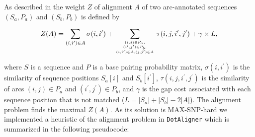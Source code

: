 \documentclass[a4paper,twoside]{article}
\newcommand\dotaligner{\texttt{DotAligner}}
\begin{document}
As described in \cite{Palu2010} the weight $Z$ of alignment \emph{A} of two
arc-annotated sequences $(S_a,P_a)$ and $(S_b,P_b)$ is defined by

\begin{equation}\label{eq1}
	Z(A) = \sum_{(i,i^\prime) \in A} \sigma(i,i^\prime) + \sum_{(i,j) \in
	P_a,\atop {(i^\prime,j^\prime) \in P_b,\atop {(i,i^\prime) \in
	A, (j,j^\prime) \in A}}} \tau(i,j,i^\prime,j^\prime) + \gamma
	\times L,
\end{equation}

where $S$ is a sequence and $P$ is a base pairing probability matrix,
$\sigma(i,i^\prime)$ is the similarity of sequence positions $S_a[i]$ and
$S_b[i^\prime]$, $\tau(i,j,i^\prime,j^\prime)$ is the similarity of arcs $(i,j)
\in P_a$ and $(i^\prime,j^\prime) \in P_b$,
and $\gamma$ is the gap cost
associated with each sequence position that is not matched ($L =
|S_a|+|S_b|-2|A|$). The alignment problem finds the maximal $Z(A)$. As its
solution is MAX-SNP-hard we implemented a heuristic of the alignment problem in
\dotaligner{} which is summarized in the following pseudocode:
\end{document}
